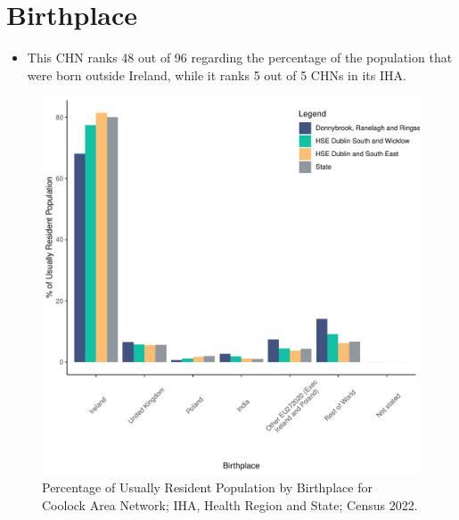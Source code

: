 \documentclass{article}
\begin{document}
\section{Birthplace}\label{sect:Birth}
\begin{itemize}
\item This CHN ranks  48 out of 96 regarding the percentage of the population that were born outside Ireland, while it ranks  5 out of 5 CHNs in its IHA.
\end{itemize}
\begin{figure}[H]
	\centering
	\includegraphics[width = 130mm]{../figures/BirthED.pdf}
	\caption{Percentage of Usually Resident Population by Birthplace for Coolock Area Network; IHA, Health Region and State; Census 2022.}
	\label{fig:vbnv}
	\end{figure}
	
\end{document}
